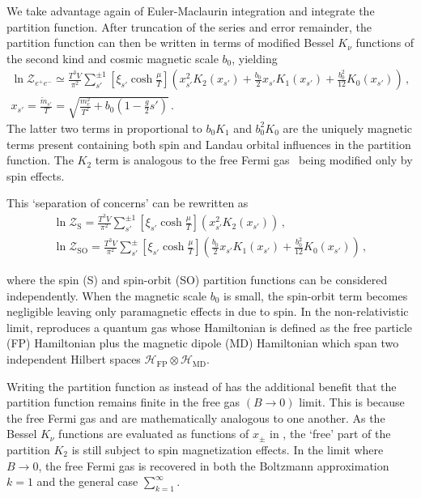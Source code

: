 We take advantage again of Euler-Maclaurin integration  and integrate the partition function. After truncation of the series and error remainder, the partition function  can then be written in terms of modified Bessel $K_{\nu}$ functions of the second kind and cosmic magnetic scale $b_{0}$, yielding
\begin{gather}
    \label{boltzmann}
    \boxed{\ln\mathcal{Z}_{e^{+}e^{-}}\simeq\frac{T^{3}V}{\pi^{2}}\sum_{s'}^{\pm1}\left[\xi_{s'}\cosh{\frac{\mu}{T}}\right]
    \left(x_{s'}^{2}K_{2}(x_{s'})+\frac{b_{0}}{2}x_{s'}K_{1}(x_{s'})+\frac{b_{0}^{2}}{12}K_{0}(x_{s'})\right)}\,,\\
    \label{xfunc}
    x_{s'}=\frac{{\tilde m}_{s'}}{T}=\sqrt{\frac{m_{e}^{2}}{T^{2}}+b_{0}\left(1-\frac{g}{2}s'\right)}\,.
\end{gather}
The latter two terms in  proportional to $b_{0}K_{1}$ and $b_{0}^{2}K_{0}$ are the uniquely magnetic terms present containing both spin and Landau orbital influences in the partition function. The $K_{2}$ term is analogous to the free Fermi gas~\citep{greiner2012thermodynamics} being modified only by spin effects.

This `separation of concerns' can be rewritten as
\begin{gather}
    \label{spin}
    \ln\mathcal{Z}_\mathrm{S}=\frac{T^{3}V}{\pi^{2}}\sum_{s'}^{\pm1}\left[\xi_{s'}\cosh{\frac{\mu}{T}}\right]\left(x_{s'}^{2}K_{2}(x_{s'})\right)\,,\\
    \label{spinorbit}
    \ln\mathcal{Z}_\mathrm{SO}=\frac{T^{3}V}{\pi^{2}}\sum_{s'}^{\pm}\left[\xi_{s'}\cosh{\frac{\mu}{T}}\right]
    \left(\frac{b_{0}}{2}x_{s'}K_{1}(x_{s'})+\frac{b_{0}^{2}}{12}K_{0}(x_{s'})\right)\,,        
\end{gather}

where the spin (S) and spin-orbit (SO) partition functions can be considered independently. When the magnetic scale $b_{0}$ is small, the spin-orbit term  becomes negligible leaving only paramagnetic effects in  due to spin. In the non-relativistic limit,  reproduces a quantum gas whose Hamiltonian is defined as the free particle (FP) Hamiltonian plus the magnetic dipole (MD) Hamiltonian which span two independent Hilbert spaces $\mathcal{H}_\mathrm{FP}\otimes\mathcal{H}_\mathrm{MD}$.

Writing the partition function as  instead of  has the additional benefit that the partition function remains finite in the free gas $({B}\rightarrow0)$ limit. This is because the free Fermi gas and  are mathematically analogous to one another. As the Bessel $K_{\nu}$ functions are evaluated as functions of $x_{\pm}$ in , the `free' part of the partition $K_{2}$ is still subject to spin magnetization effects. In the limit where ${B}\rightarrow0$, the free Fermi gas is recovered in both the Boltzmann approximation $k=1$ and the general case $\sum_{k=1}^{\infty}$.


